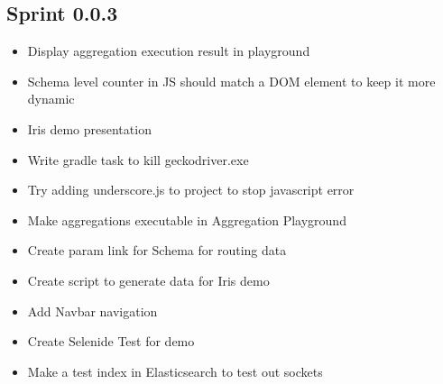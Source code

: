\documentclass[12pt]{report}
\begin{document}
\subsection*{Sprint 0.0.3}
\begin{itemize}
\item Display aggregation execution result in playground
\item Schema level counter in JS should match a DOM element to keep it more dynamic
\item Iris demo presentation
\item Write gradle task to kill geckodriver.exe
\item Try adding underscore.js to project to stop javascript error
\item Make aggregations executable in Aggregation Playground
\item Create param link for Schema for routing data
\item Create script to generate data for Iris demo
\item Add Navbar navigation
\item Create Selenide Test for demo
\item Make a test index in Elasticsearch to test out sockets
\end{itemize}
\end{document}
